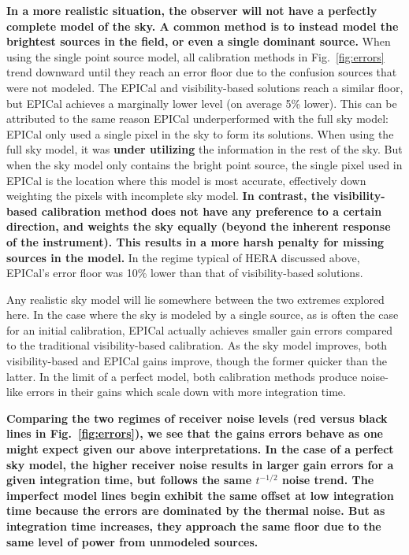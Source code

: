 \documentclass[a4paper,fleqn,usenatbib]{../mnras}
\begin{document}
\textbf{In a more realistic situation, the observer will not have a perfectly complete model of the sky.
A common method is to instead model the brightest sources in the field,
or even a single dominant source.}
When using the single point source model, all calibration methods in Fig.~\ref{fig:errors} trend 
downward until they reach an error floor due to the confusion sources that were not modeled. 
The EPICal and visibility-based solutions reach a similar floor, but EPICal achieves a 
marginally lower level (on average 5\% lower). This can be attributed to the same reason 
EPICal underperformed with the full sky model: EPICal only used a single pixel in the sky to 
form its solutions. When using the full sky model, it was \textbf{under utilizing} the information in the 
rest of the sky. But when the sky model only contains the bright point source, the single pixel 
used in EPICal is the location where this model is most accurate, effectively down weighting 
the pixels with incomplete sky model. 
\textbf{In contrast, the visibility-based calibration method 
does not have any preference to a certain direction, and
weights the sky equally (beyond the inherent response
of the instrument).
This results in a more harsh penalty for missing sources in the model.}
In the regime typical of HERA discussed above, EPICal's 
error floor was 10\% lower than that of visibility-based solutions.

Any realistic sky model will lie somewhere between the two extremes explored here. In the 
case where the sky is modeled by a single source, as is often the case for an initial calibration, 
EPICal actually achieves smaller gain errors compared to the traditional visibility-based 
calibration. As the sky model improves, both visibility-based and EPICal gains improve, though 
the former quicker than the latter. In the limit of a perfect model, both calibration methods 
produce noise-like errors in their gains which scale down with more integration time.

\textbf{Comparing the two regimes of receiver noise levels (red versus black lines in 
Fig.~\ref{fig:errors}), we see that the gains errors behave as one might expect given our
above interpretations. In the case of a perfect sky model, the higher receiver noise results
in larger gain errors for a given integration time, but follows the same $t^{-1/2}$ noise 
trend. The imperfect model lines begin exhibit the same offset at low integration time
because the errors are dominated by the thermal noise. But as integration time increases,
they approach the same floor due to the same level of power from unmodeled sources.}
\end{document}

